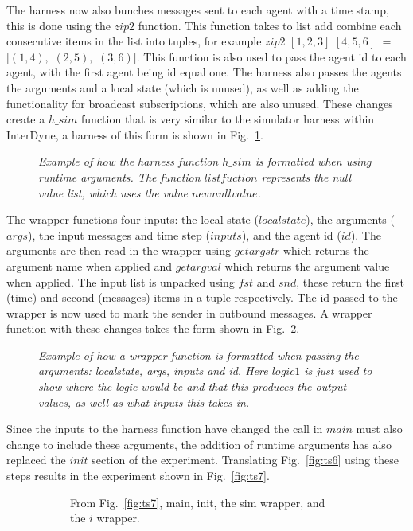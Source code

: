 \documentclass{article}
\begin{document}
The harness now also bunches messages sent to each agent with a time stamp, this is done using the $zip2$ function. This function takes to list add combine each consecutive items in the list into tuples, for example $zip2$ $[1,2,3]$ $[4,5,6]$ $=$ $[(1,4),$ $(2,5),$ $(3,6)]$. This function is also used to pass the agent id to each agent, with the first agent being id equal one. The harness also passes the agents the arguments and a local state (which is unused), as well as adding the functionality for broadcast subscriptions, which are also unused. These changes create a $h\_sim$ function that is very similar to the simulator harness within InterDyne, a harness of this form is shown in Fig.~\ref{fig:harn7}.  
\begin{figure}[H]
	\centering
	
	\caption{\it Example of how the harness function $h\_sim$ is formatted when using runtime arguments. The function $listfuction$ represents the null value list, which uses the value $newnullvalue$.  }
	\label{fig:harn7}
\end{figure} 

The wrapper functions four inputs: the local state ($localstate$), the arguments ($args$), the input messages and time step ($inputs$), and the agent id ($id$). The arguments are then read in the wrapper using $getargstr$ which returns the argument name when applied and $getargval$ which returns the argument value when applied. The input list is unpacked using $fst$ and $snd$, these return the first (time) and second (messages) items in a tuple respectively. The id passed to the wrapper is now used to mark the sender in outbound messages. A wrapper function with these changes takes the form shown in Fig.~\ref{fig:wrap7}. 
\begin{figure}[H]
	\centering
	
	\caption{\it Example of how a wrapper function is formatted when passing the arguments: localstate, args, inputs and id. Here $logic1$ is just used to show where the logic would be and that this produces the output values, as well as what inputs this takes in.  }
	\label{fig:wrap7}
\end{figure} 

Since the inputs to the harness function have changed the call in $main$ must also change to include these arguments, the addition of runtime arguments has also replaced the $init$ section of the experiment. Translating Fig.~\ref{fig:ts6} using these steps results in the experiment shown in Fig.~\ref{fig:ts7}.
\begin{figure}[H]
	\centering
	\begin{subfigure}[b]{1\textwidth}
	
	\caption{From Fig.~\ref{fig:ts7}, main, init, the sim wrapper, and the $i$ wrapper.  }
        \label{fig:ts71}
	\end{subfigure}
	\caption*{}
\end{figure}
	
\end{document}
